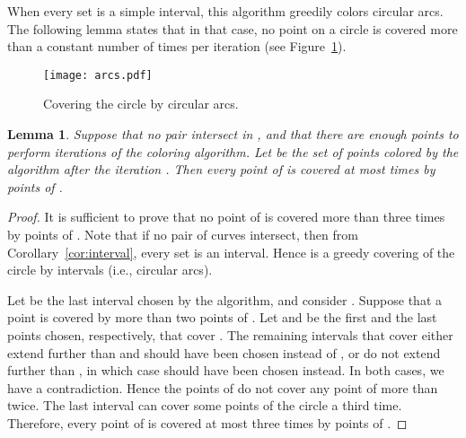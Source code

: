 \documentclass[english,11pt]{article}
\newtheorem{lemma}{Lemma}
\begin{document}
When every set  is a simple interval, this algorithm greedily colors circular arcs. The following lemma states that in that case, no point on a circle is covered more than a constant number of times per iteration (see Figure~\ref{fig:arcs}).

\begin{figure}[htb]
\begin{center}
\texttt{[image: arcs.pdf]}
\end{center}
\caption{\label{fig:arcs}Covering the circle  by circular arcs.}
\end{figure}

\begin{lemma}
\label{lem:coloring}
Suppose that no pair  intersect in , and that there are enough points to perform  iterations of the coloring algorithm. Let  be the set of points colored by the algorithm after the iteration . Then every point of  is covered at most  times by points of .
\end{lemma}
\begin{proof}
It is sufficient to prove that no point of  is covered more than three times by points of .
Note that if no pair of curves intersect, then from Corollary~\ref{cor:interval}, every set  is an interval. Hence  is a greedy covering of the circle by intervals (i.e., circular arcs).

Let  be the last interval chosen by the algorithm, and consider . Suppose that a point  is covered by more than two points of . Let  and  be the first and the last points chosen, respectively, that cover . The remaining intervals that cover  either extend further than  and should have been chosen instead of , or do not extend further than , in which case  should have been chosen instead. In both cases, we have a contradiction. Hence the points of  do not cover any point of  more than twice. The last interval  can cover some points of the circle a third time. Therefore, every point of  is covered at most three times by points of .
\end{proof}
\end{document}
